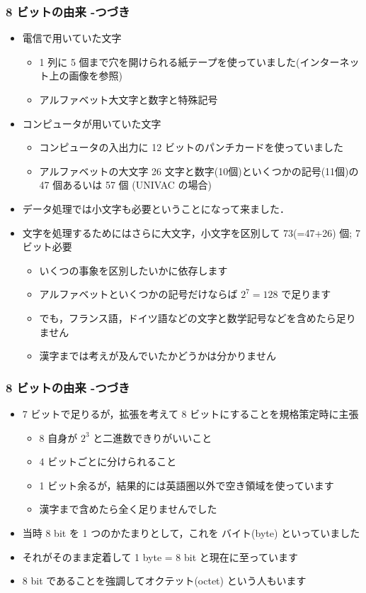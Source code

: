 \begin{frame}
\frametitle{8 ビットの由来 -つづき}
  \begin{itemize}
\footnotesize
\item 電信で用いていた文字
    \begin{itemize}
\footnotesize
\item 1 列に 5 個まで穴を開けられる紙テープを使っていました(インターネット上の画像を参照)
\item アルファベット大文字と数字と特殊記号
    \end{itemize}
\item コンピュータが用いていた文字
    \begin{itemize}
\footnotesize
\item コンピュータの入出力に 12 ビットのパンチカードを使っていました
\item アルファベットの大文字 26 文字と数字(10個)といくつかの記号(11個)の 47 個あるいは 57 個 (UNIVAC の場合)
    \end{itemize}
\item データ処理では小文字も必要ということになって来ました．
\item 文字を処理するためにはさらに大文字，小文字を区別して 73(=47+26) 個; 7 ビット必要
    \begin{itemize}
\footnotesize
\item いくつの事象を区別したいかに依存します
\item アルファベットといくつかの記号だけならば \(2^7=128\) で足ります
\item でも，フランス語，ドイツ語などの文字と数学記号などを含めたら足りません
\item 漢字までは考えが及んでいたかどうかは分かりません
    \end{itemize}
  \end{itemize}
\end{frame}
\begin{frame}
\frametitle{8 ビットの由来 -つづき}
  \begin{itemize}
\footnotesize
\item 7 ビットで足りるが，拡張を考えて 8 ビットにすることを規格策定時に主張
    \begin{itemize}
\item 8 自身が \(2^3\) と二進数できりがいいこと
\item 4 ビットごとに分けられること
\item 1 ビット余るが，結果的には英語圏以外で空き領域を使っています
\item 漢字まで含めたら全く足りませんでした
    \end{itemize}
\item 当時 8 bit を 1 つのかたまりとして，これを バイト(byte) といっていました
\item それがそのまま定着して 1 byte = 8 bit と現在に至っています
\item 8 bit であることを強調してオクテット(octet) という人もいます
  \end{itemize}
\end{frame}
